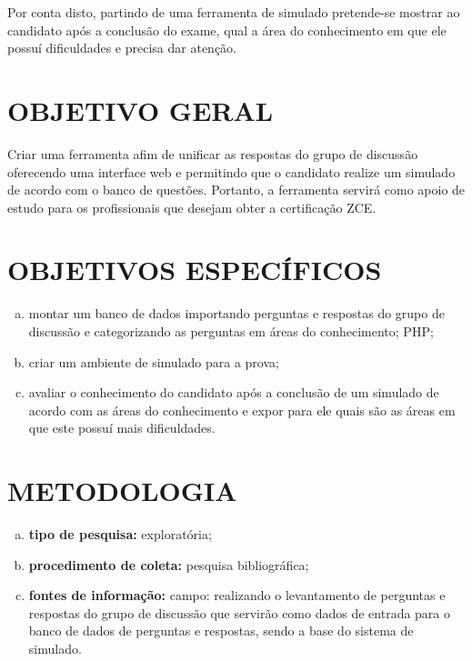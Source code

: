 Por conta disto, partindo de uma ferramenta de simulado pretende-se mostrar ao
candidato após a conclusão do exame, qual a área do conhecimento em que ele 
possuí dificuldades e precisa dar atenção.

\section{OBJETIVO GERAL}

Criar uma ferramenta afim de unificar as respostas do grupo de discussão
oferecendo uma interface web e permitindo que o candidato realize um simulado 
de acordo com o banco de questões. Portanto, a ferramenta servirá como apoio de
estudo para os profissionais que desejam obter a certificação ZCE.

\section{OBJETIVOS ESPECÍFICOS}

\begin{enumerate}[a)]
    \item montar um banco de dados importando perguntas e respostas do grupo de
    discussão e categorizando as perguntas em áreas do conhecimento; PHP;
    \item criar um ambiente de simulado para a prova;
    \item avaliar o conhecimento do candidato após a conclusão de um simulado 
    de acordo com as áreas do conhecimento e expor para ele quais são as áreas  em
    que este possuí mais dificuldades.
\end{enumerate}

\section{METODOLOGIA}

\begin{enumerate}[a)]
    \item \textbf{tipo de pesquisa:} exploratória;
    \item \textbf{procedimento de coleta:} pesquisa bibliográfica;
    \item \textbf{fontes de informação:} campo: realizando o levantamento de
    perguntas e respostas do grupo de discussão que servirão como dados de 
    entrada para o banco de dados de perguntas e respostas, sendo a base do 
    sistema de simulado.
\end{enumerate}